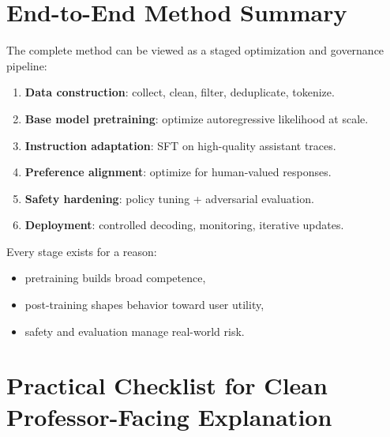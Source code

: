 \documentclass[12pt]{article}
\begin{document}
\section{End-to-End Method Summary}

The complete method can be viewed as a staged optimization and governance pipeline:
\begin{enumerate}
    \item \textbf{Data construction}: collect, clean, filter, deduplicate, tokenize.
    \item \textbf{Base model pretraining}: optimize autoregressive likelihood at scale.
    \item \textbf{Instruction adaptation}: SFT on high-quality assistant traces.
    \item \textbf{Preference alignment}: optimize for human-valued responses.
    \item \textbf{Safety hardening}: policy tuning + adversarial evaluation.
    \item \textbf{Deployment}: controlled decoding, monitoring, iterative updates.
\end{enumerate}

Every stage exists for a reason:
\begin{itemize}
    \item pretraining builds broad competence,
    \item post-training shapes behavior toward user utility,
    \item safety and evaluation manage real-world risk.
\end{itemize}

\section{Practical Checklist for Clean Professor-Facing Explanation}
\end{document}
